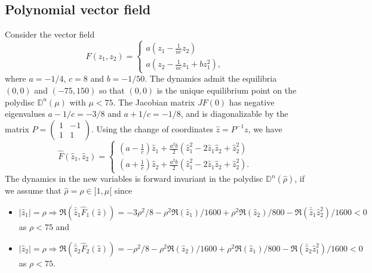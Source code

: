 \documentclass{article}
\begin{document}
\subsection{Polynomial vector field}
\label{sec:ex1}

Consider the vector field %
\begin{equation}\label{eq:example_1}
F(z_1,z_2)=\begin{cases} a \left(z_1-\frac{1}{ac}z_2\right)\\
a \left(z_2-\frac{1}{ac}z_1+bz_1^2\right),\end{cases}
\end{equation}
where $a=-1/4$, $c=8$ and $b=-1/50$.
The dynamics admit the equilibria $(0,0)$ and $\left( -75, 150\right)$ so that $(0,0)$ is the unique equilibrium point on the polydisc $\mathbb{D}^n\left(\mu\right)$ with $\mu<75$. 
The Jacobian matrix $JF(0)$ has negative eigenvalues  \mbox{$a-1/c=-3/8$} and $a+1/c=-1/8$, and is diagonalizable by the matrix $P= \begin{pmatrix} 1 & -1\\
1 & 1\end{pmatrix}$.
Using the change of coordinates $\widehat{z}=P^{-1}z$, we have
\begin{equation}\label{eq:new_example_1}
\widehat{F}(\widehat{z}_1,\widehat{z}_2)
=\begin{cases}   (a-\frac{1}{c})\widehat{z}_1 +\frac{a^2b}{2} \left( \widehat{z}_1^2-2\widehat{z}_1\widehat{z}_2+\widehat{z}_2^2 \right)   \\
(a+\frac{1}{c})\widehat{z}_2 +\frac{a^2b}{2} \left( \widehat{z}_1^2-2\widehat{z}_1\widehat{z}_2+\widehat{z}_2^2 \right).\end{cases}
\end{equation}
The dynamics in the new variables is forward invariant in the polydisc $\mathbb{D}^n\left(\widehat{\rho}\right)$, if we assume that $\widehat{\rho}=\rho\in ]1,\mu[$  since 
 \begin{itemize}
 \item {\small $|\widehat{z}_1|=\rho \Rightarrow \Re\left( \bar{\widehat{z}}_1 \widehat{F}_1(\widehat{z}) \right)=-3\rho^2/8-\rho^2\Re\left( \widehat{z}_1 \right)/1600+\rho^2\Re\left( \widehat{z}_2 \right)/800-\Re\left( \bar{\widehat{z}}_1 \widehat{z}_2^2\right)/1600<0$} as $\rho<75$ and
 \item  {\small $|\widehat{z}_2|=\rho \Rightarrow \Re\left( \bar{\widehat{z}}_2 \widehat{F}_2(\widehat{z}) \right)=-\rho^2/8-\rho^2\Re\left( \widehat{z}_2 \right)/1600+\rho^2\Re\left( \widehat{z}_1 \right)/800-\Re\left( \bar{\widehat{z}}_2 \widehat{z}_1^2\right)/1600<0$ as $\rho<75$.}
 \end{itemize}
\end{document}
